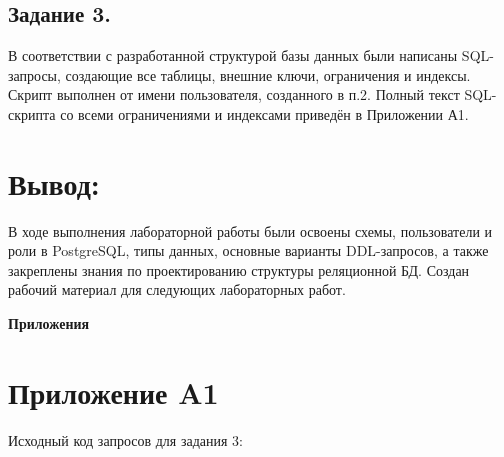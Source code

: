 \documentclass[oneside,a4paper,14pt]{extarticle} %
\begin{document}
\newpage
\subsection[short]{Задание 3.}
В соответствии с разработанной структурой базы данных были написаны SQL-запросы, создающие все таблицы, внешние ключи, ограничения и индексы. Скрипт выполнен от имени пользователя, созданного в п.2. Полный текст SQL-скрипта со всеми ограничениями и индексами приведён в Приложении А1.


\section*{Вывод:}
В ходе выполнения лабораторной работы были освоены схемы, пользователи и роли в PostgreSQL, типы данных, основные варианты DDL-запросов, а также закреплены знания по проектированию структуры реляционной БД. Создан рабочий материал для следующих лабораторных работ.

\newpage
\begin{flushright} \bf Приложения \end{flushright}
\section*{Приложение A1}
Исходный код запросов для задания 3:
\inputminted{sql}{../autoclub.sql} 
\newpage
\end{document}
